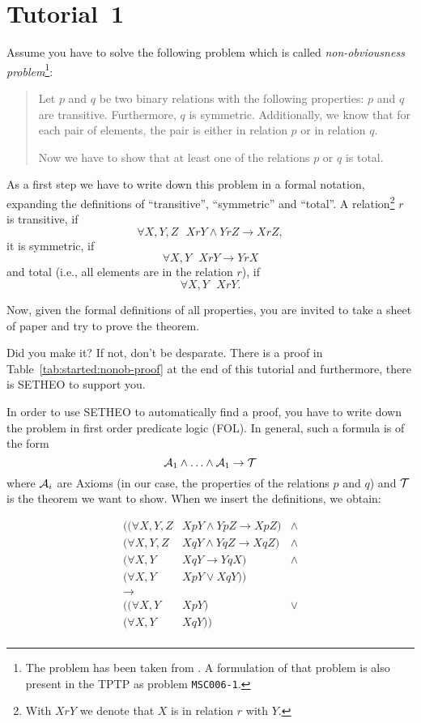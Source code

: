 %

\section{Tutorial~1}

Assume you have to solve the following problem which is called {\em
non-obviousness problem}\footnote{
	The problem has been taken from \cite{PELLAAR}. A formulation
	of that problem is also present in the TPTP \cite{SSY94} as problem
	{\tt MSC006-1}.}:
\begin{quote}
Let $p$ and $q$ be two binary relations with the following properties:
$p$ and $q$ are transitive. Furthermore, $q$ is symmetric.
Additionally, we know that for each pair of elements, the pair is
either in relation $p$ or in relation $q$.

Now we have to show that at least one of the relations $p$ or $q$
is total.
\end{quote}

As a first step we have to write down this problem in a formal
notation, expanding the definitions of ``transitive'', ``symmetric''
and ``total''. 
A relation\footnote{
	With $XrY$ we denote that $X$ is in relation $r$ with $Y$.
	}
$r$ is transitive, if
\[ \forall X,Y,Z \mbox{\ \ \ } XrY \wedge YrZ \rightarrow XrZ,\]
it is symmetric, if
\[ \forall X,Y \mbox{\ \ \ } XrY \rightarrow YrX\]
and total (i.e., all elements are in the relation $r$), if
\[ \forall X,Y \mbox{\ \ \ } XrY.\]

Now, given the formal definitions of all properties, you are invited
to take a sheet of paper and try to prove the theorem.

Did you make it?
If not, don't be desparate. There is a proof in Table~\ref{tab:started:nonob-proof} at the end of this tutorial and furthermore, there is SETHEO to
support you.

In order to use SETHEO to automatically find a proof, you have to write
down the problem in first order predicate logic (FOL).
In general, such a formula is of the form
\[ 
{\cal A}_1 \wedge \ldots  \wedge {\cal A}_1 \rightarrow {\cal T}
\]
where ${\cal A}_i$ are Axioms (in our case, the properties of the relations
$p$ and $q$) and ${\cal T}$ is the theorem we want to show.
When we insert the definitions, we obtain:

\[
\begin{array}{lll}
(( \forall X,Y,Z  & XpY \wedge YpZ \rightarrow XpZ ) & \wedge \\
( \forall X,Y,Z  & XqY \wedge YqZ \rightarrow XqZ ) & \wedge \\
( \forall X,Y  & XqY \rightarrow YqX )& \wedge \\
( \forall X,Y  & XpY \vee XqY)) &  \\
\rightarrow \\
(( \forall X,Y  & XpY ) & \vee \\
( \forall X,Y  & XqY )) & \\
\end{array}
\]

